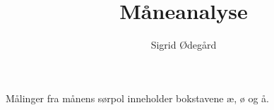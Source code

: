 \documentclass{article}
\title{Måneanalyse}
\author{Sigrid Ødegård}
\begin{document}
\maketitle
Målinger fra månens sørpol inneholder bokstavene æ, ø og å.
\end{document}
